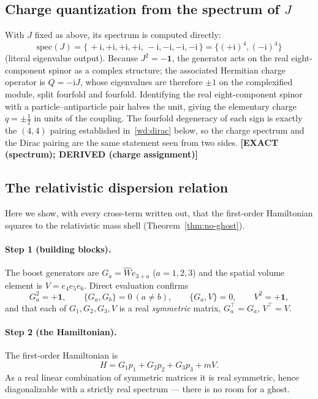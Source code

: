 \documentclass[11pt,oneside]{book}
\newcommand{\Wh}{\hat{W}}                         %
\newcommand{\status}[1]{{\sffamily\bfseries\color{statuscol}[#1]}}
\theoremstyle{plain}
\theoremstyle{definition}
\theoremstyle{remark}
\begin{document}
\subsection{Charge quantization from the spectrum of \texorpdfstring{$J$}{J}}
\label{wd:charge}
With $J$ fixed as above, its spectrum is computed directly:
\[
  \mathrm{spec}(J)=\{\,+\mathrm i,+\mathrm i,+\mathrm i,+\mathrm i,\,
                       -\mathrm i,-\mathrm i,-\mathrm i,-\mathrm i\,\}
                 =\{(+\mathrm i)^4,(-\mathrm i)^4\}
\]
(literal eigenvalue output). Because $J^2=-\mathbf 1$, the generator acts on the real
eight-component spinor as a complex structure; the associated Hermitian charge operator
is $Q=-\mathrm i J$, whose eigenvalues are therefore $\pm1$ on the complexified module,
split fourfold and fourfold. Identifying the real eight-component spinor with a
particle--antiparticle pair halves the unit, giving the elementary charge
$q=\pm\tfrac12$ in units of the coupling. The fourfold degeneracy of each sign is
exactly the $(4,4)$ pairing established in~\ref{wd:dirac} below, so the charge spectrum
and the Dirac pairing are the same statement seen from two sides. \status{EXACT
(spectrum); DERIVED (charge assignment)}

\subsection{The relativistic dispersion relation}
\label{wd:dispersion}
Here we show, with every cross-term written out, that the first-order Hamiltonian
squares to the relativistic mass shell (Theorem~\ref{thm:no-ghost}).

\paragraph{Step 1 (building blocks).}
The boost generators are $G_a=\Wh e_{3+a}$ ($a=1,2,3$) and the spatial volume element is
$V=e_4e_5e_6$. Direct evaluation confirms
\[
  G_a^2=+\mathbf 1,\qquad
  \{G_a,G_b\}=0\ (a\neq b),\qquad
  \{G_a,V\}=0,\qquad
  V^2=+\mathbf 1,
\]
and that each of $G_1,G_2,G_3,V$ is a real \emph{symmetric} matrix,
$G_a^\top=G_a$, $V^\top=V$.

\paragraph{Step 2 (the Hamiltonian).}
The first-order Hamiltonian is
\[
  H=G_1p_1+G_2p_2+G_3p_3+mV .
\]
As a real linear combination of symmetric matrices it is real symmetric, hence
diagonalizable with a strictly real spectrum --- there is no room for a ghost.
\end{document}

